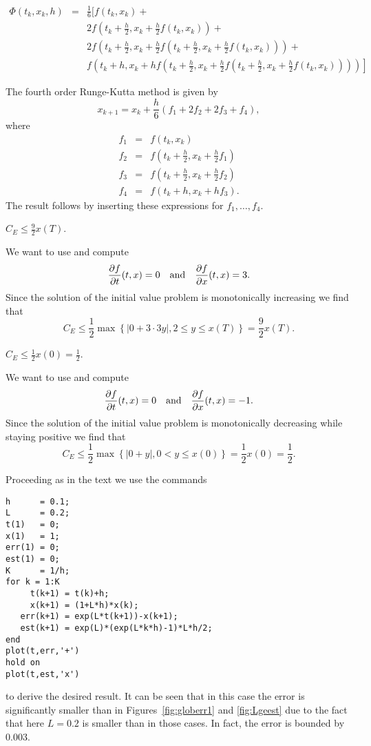  \ans
\begin{eqnarray*}
\Phi(t_k,x_k,h) & = & \frac{1}{6}\Big[f(t_k,x_k)+\\
&&2f\left(t_k+\frac{h}{2},x_k+\frac{h}{2}f(t_k,x_k)\right) +\\
&&2f\left(t_k+\frac{h}{2},x_k+
  \frac{h}{2}f\left(t_k+\frac{h}{2},x_k+\frac{h}{2}f(t_k,x_k)\right)\right)+\\
&&\left.f\left(t_k+h,x_k+hf\left(t_k+\frac{h}{2},x_k+
  \frac{h}{2}f\left(t_k+\frac{h}{2},x_k+
  \frac{h}{2}f(t_k,x_k)\right)\right)\right)\right]
\end{eqnarray*}

\soln The fourth order Runge-Kutta method is given by
\[
x_{k+1} = x_k+\frac{h}{6}(f_1+2f_2+2f_3+f_4),
\]
where
\begin{eqnarray*}
f_1 &=& f(t_k,x_k)\\
f_2 &=& f\left(t_k+\frac{h}{2},x_k+\frac{h}{2}f_1\right)\\
f_3 &=& f\left(t_k+\frac{h}{2},x_k+\frac{h}{2}f_2\right)\\
f_4 &=& f(t_k+h,x_k+hf_3).
\end{eqnarray*}
The result follows by inserting these expressions for $f_1,\ldots,f_4$.

 \ans $C_E \le \frac{9}{2}x(T)$.

\soln We want to use  and compute
\[
\frac{\partial f}{\partial t}(t,x)=0\quad\mbox{and}\quad
\frac{\partial f}{\partial x}(t,x)=3.
\]
Since the solution of the initial value problem is monotonically
increasing we find that
\[
C_E\le \frac{1}{2}\max\left\{ \left\vert 0+3\cdot 3y\right\vert,
2\le y\le x(T) \right\} = \frac{9}{2}x(T).
\]

 \ans $C_E \le \frac{1}{2}x(0)=\frac{1}{2}$.

\soln We want to use  and compute
\[
\frac{\partial f}{\partial t}(t,x)=0\quad\mbox{and}\quad
\frac{\partial f}{\partial x}(t,x)=-1.
\]
Since the solution of the initial value problem is monotonically
decreasing while staying positive we find that
\[
C_E\le \frac{1}{2}\max\left\{ \left\vert 0+y\right\vert,
0<y\le x(0) \right\} = \frac{1}{2}x(0)=\frac{1}{2}.
\]


Proceeding as in the text we use the \Matlab commands
\begin{verbatim}
h      = 0.1;
L      = 0.2;
t(1)   = 0;
x(1)   = 1;
err(1) = 0;
est(1) = 0;
K      = 1/h;
for k = 1:K
     t(k+1) = t(k)+h;
     x(k+1) = (1+L*h)*x(k);
   err(k+1) = exp(L*t(k+1))-x(k+1);
   est(k+1) = exp(L)*(exp(L*k*h)-1)*L*h/2;
end
plot(t,err,'+')
hold on
plot(t,est,'x')
\end{verbatim}
to derive the desired result.  It can be seen that in this case
the error is significantly smaller than in Figures~\ref{fig:globerr1}
and \ref{fig:Lgeest} due to the fact that here $L=0.2$ is smaller
than in those cases.  In fact, the error is bounded by $0.003$.



